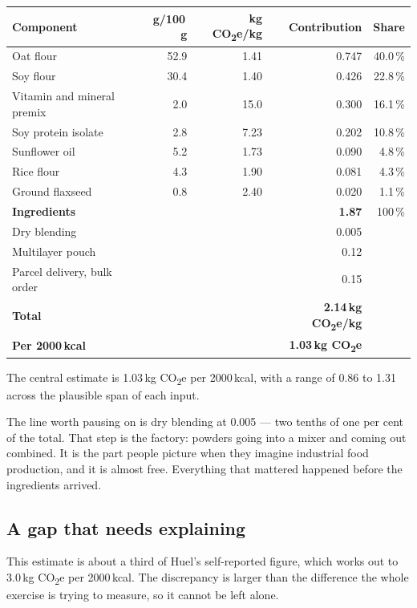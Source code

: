 \documentclass[11pt,a4paper]{article}
\newcommand{\co}{CO\textsubscript{2}e}
\begin{document}
\begin{table}[h]
\centering
\footnotesize
\begin{tabular}{@{}lrrrr@{}}
\toprule
\textbf{Component} & \textbf{g/100\,g} & \textbf{kg \co{}/kg} & \textbf{Contribution} & \textbf{Share} \\
\midrule
Oat flour & 52.9 & 1.41 & 0.747 & 40.0\,\% \\
Soy flour & 30.4 & 1.40 & 0.426 & 22.8\,\% \\
Vitamin and mineral premix & 2.0 & 15.0 & 0.300 & 16.1\,\% \\
Soy protein isolate & 2.8 & 7.23 & 0.202 & 10.8\,\% \\
Sunflower oil & 5.2 & 1.73 & 0.090 & 4.8\,\% \\
Rice flour & 4.3 & 1.90 & 0.081 & 4.3\,\% \\
Ground flaxseed & 0.8 & 2.40 & 0.020 & 1.1\,\% \\
\midrule
\textbf{Ingredients} & & & \textbf{1.87} & 100\,\% \\
Dry blending & & & 0.005 & \\
Multilayer pouch & & & 0.12 & \\
Parcel delivery, bulk order & & & 0.15 & \\
\midrule
\textbf{Total} & & & \textbf{2.14\,kg \co{}/kg} & \\
\textbf{Per 2000\,kcal} & & & \textbf{1.03\,kg \co{}} & \\
\bottomrule
\end{tabular}
\end{table}

The central estimate is 1.03\,kg \co{} per 2000\,kcal, with a range of 0.86 to 1.31
across the plausible span of each input.

The line worth pausing on is dry blending at 0.005 — two tenths of one per cent of
the total. That step is the factory: powders going into a mixer and coming out
combined. It is the part people picture when they imagine industrial food production,
and it is almost free. Everything that mattered happened before the ingredients
arrived.

\subsection{A gap that needs explaining}

This estimate is about a third of Huel's self-reported figure, which works out to
3.0\,kg \co{} per 2000\,kcal. The discrepancy is larger than the difference the whole
exercise is trying to measure, so it cannot be left alone.
\end{document}
